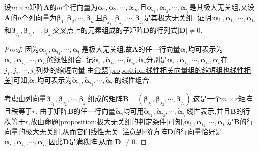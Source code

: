 \documentclass[../../main.tex]{subfiles}%
\begin{document}
\begin{proposition}\label{proposition:极大无关组对应的子式不为零}
设\(m\times n\)矩阵\(\boldsymbol{A}\)的\(m\)个行向量为\(\boldsymbol{\alpha}_1,\boldsymbol{\alpha}_2,\cdots,\boldsymbol{\alpha}_m\),且\(\boldsymbol{\alpha}_{i_1},\boldsymbol{\alpha}_{i_2},\cdots,\boldsymbol{\alpha}_{i_r}\)是其极大无关组,又设\(\boldsymbol{A}\)的\(n\)个列向量为\(\boldsymbol{\beta}_1,\boldsymbol{\beta}_2,\cdots,\boldsymbol{\beta}_n\),且\(\boldsymbol{\beta}_{j_1},\boldsymbol{\beta}_{j_2},\cdots,\boldsymbol{\beta}_{j_r}\)是其极大无关组. 证明:\(\boldsymbol{\alpha}_{i_1},\boldsymbol{\alpha}_{i_2},\cdots,\boldsymbol{\alpha}_{i_r}\)和\(\boldsymbol{\beta}_{j_1},\boldsymbol{\beta}_{j_2},\cdots,\boldsymbol{\beta}_{j_r}\)交叉点上的元素组成的子矩阵\(\boldsymbol{D}\)的行列式\(|\boldsymbol{D}|\neq0\).
\end{proposition}
\begin{proof}
因为\(\boldsymbol{\alpha}_{i_1},\boldsymbol{\alpha}_{i_2},\cdots,\boldsymbol{\alpha}_{i_r}\)是极大无关组,故\(\boldsymbol{A}\)的任一行向量\(\boldsymbol{\alpha}_s\)均可表示为\(\boldsymbol{\alpha}_{i_1},\boldsymbol{\alpha}_{i_2},\cdots,\boldsymbol{\alpha}_{i_r}\)的线性组合. 记\(\widetilde{\boldsymbol{\alpha}}_{i_1},\widetilde{\boldsymbol{\alpha}}_{i_2},\cdots,\widetilde{\boldsymbol{\alpha}}_{i_r},\widetilde{\boldsymbol{\alpha}}_s\)分别是\(\boldsymbol{\alpha}_{i_1},\boldsymbol{\alpha}_{i_2},\cdots,\boldsymbol{\alpha}_{i_r},\boldsymbol{\alpha}_s\)在\(j_1,j_2,\cdots,j_r\)列处的缩短向量,由\hyperref[proposition:线性相关向量组的缩短组也线性相关]{命题\ref{proposition:线性相关向量组的缩短组也线性相关}}可知,\(\widetilde{\boldsymbol{\alpha}}_s\)均可表示为\(\widetilde{\boldsymbol{\alpha}}_{i_1},\widetilde{\boldsymbol{\alpha}}_{i_2},\cdots,\widetilde{\boldsymbol{\alpha}}_{i_r}\)的线性组合.

考虑由列向量\(\boldsymbol{\beta}_{j_1},\boldsymbol{\beta}_{j_2},\cdots,\boldsymbol{\beta}_{j_r}\)组成的矩阵\(\boldsymbol{B}=(\boldsymbol{\beta}_{j_1},\boldsymbol{\beta}_{j_2},\cdots,\boldsymbol{\beta}_{j_r})\),这是一个\(m\times r\)矩阵且秩等于\(r\). 由于矩阵\(\boldsymbol{B}\)的任一行向量\(\widetilde{\boldsymbol{\alpha}}_s\)均可用\(\widetilde{\boldsymbol{\alpha}}_{i_1},\widetilde{\boldsymbol{\alpha}}_{i_2},\cdots,\widetilde{\boldsymbol{\alpha}}_{i_r}\)线性表示,并且\(\boldsymbol{B}\)的行秩等于\(r\),故由\hyperref[proposition:极大无关组的判定条件]{命题\ref{proposition:极大无关组的判定条件}}可知,\(\widetilde{\boldsymbol{\alpha}}_{i_1},\widetilde{\boldsymbol{\alpha}}_{i_2},\cdots,\widetilde{\boldsymbol{\alpha}}_{i_r}\)是\(\boldsymbol{B}\)的行向量的极大无关组,从而它们线性无关. 注意到\(r\)阶方阵\(\boldsymbol{D}\)的行向量恰好是\(\widetilde{\boldsymbol{\alpha}}_{i_1},\widetilde{\boldsymbol{\alpha}}_{i_2},\cdots,\widetilde{\boldsymbol{\alpha}}_{i_r}\),因此\(\boldsymbol{D}\)是满秩阵,从而\(|\boldsymbol{D}|\neq0\).
\end{proof}
\end{document}
